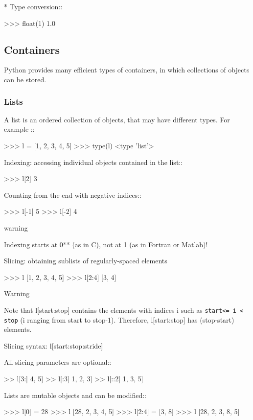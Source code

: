 \documentclass[a4paper,11pt]{extarticle}
\begin{document}
* Type conversion::
\begin{pyconcode}
>>> float(1)
1.0
\end{pyconcode}

\subsection{Containers}


Python provides many efficient types of containers, in which collections of
objects can be stored.

\subsubsection{Lists}

A list is an ordered collection of objects, that may have different
types. For example ::
\begin{pyconcode}
>>> l = [1, 2, 3, 4, 5]
>>> type(l)
<type 'list'>
\end{pyconcode}

Indexing: accessing individual objects contained in the list::
\begin{pyconcode}
>>> l[2]
3
\end{pyconcode}

Counting from the end with negative indices::
\begin{pyconcode}
>>> l[-1]
5
>>> l[-2]
4
\end{pyconcode}

warning

Indexing starts at 0** (as in C), not at 1 (as in Fortran or Matlab)!

Slicing: obtaining sublists of regularly-spaced elements
\begin{pyconcode}
>>> l
[1, 2, 3, 4, 5]
>>> l[2:4]
[3, 4]
\end{pyconcode}

Warning

Note that l[start:stop] contains the elements with indices i
such as  \texttt{start<= i < stop} (i ranging from start to
stop-1). Therefore, l[start:stop] has (stop-start) elements.

Slicing syntax: l[start:stop:stride]

All slicing parameters are optional::
\begin{pyconcode}
>> l[3:]
4, 5]
>> l[:3]
1, 2, 3]
>> l[::2]
1, 3, 5]
\end{pyconcode}

Lists are mutable objects and can be modified::
\begin{pyconcode}
>>> l[0] = 28
>>> l
[28, 2, 3, 4, 5]
>>> l[2:4] = [3, 8] 
>>> l
[28, 2, 3, 8, 5]
\end{pyconcode}
\end{document}
